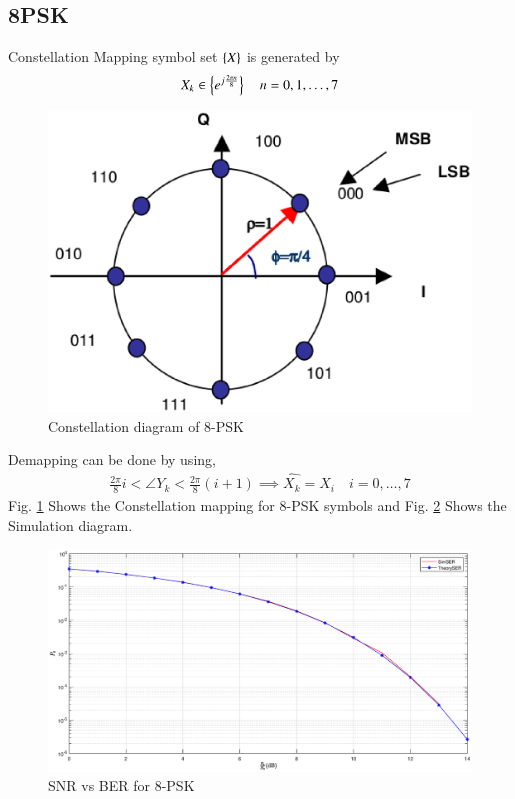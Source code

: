 \documentclass[journal,12pt,twocolumn]{IEEEtran}
\begin{document}
\subsection{8PSK}
Constellation Mapping symbol set $\left\{X\right\}$ is generated by
\begin{equation}
X_k \in \left\{e^{j \frac{2\pi n}{8}}\right\} \quad n=0,1,\dots,7
\end{equation}
\begin{figure}[!ht]
\begin{center}
\includegraphics[width=\columnwidth]{./figs/8psk}
\end{center}
\caption{Constellation diagram of 8-PSK}
\label{fig:8psk}
\end{figure}
Demapping can be done by using,
\begin{align}
\frac{2\pi }{8}i < \angle{Y_k} < \frac{2\pi }{8}(i+1) \implies \hat{X_k}=X_i \quad i=0,\dots,7
\end{align}
Fig. \ref{fig:8psk} Shows the Constellation mapping for 8-PSK symbols and Fig. \ref{fig:8psk1} Shows the Simulation diagram.
%
\begin{figure}[!ht]
\begin{center}
\includegraphics[width=\columnwidth]{./figs/8PSK1}
\end{center}
\caption{SNR vs BER for 8-PSK}
\label{fig:8psk1}
\end{figure}
%
\end{document}
